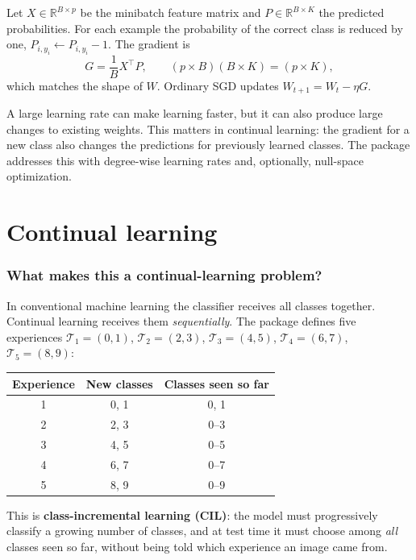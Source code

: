 \documentclass[11pt,a4paper]{article}
\newcommand{\R}{\mathbb{R}}
\begin{document}
Let $X\in\R^{B\times p}$ be the minibatch feature matrix and $P\in\R^{B\times K}$ the predicted probabilities. For each example the probability of the correct class is reduced by one, $P_{i,y_i}\leftarrow P_{i,y_i}-1$. The gradient is
\[
G=\frac1B X^\top P,\qquad (p\times B)(B\times K)=(p\times K),
\]
which matches the shape of $W$. Ordinary SGD updates $W_{t+1}=W_t-\eta G$.

A large learning rate can make learning faster, but it can also produce large changes to existing weights. This matters in continual learning: the gradient for a new class also changes the predictions for previously learned classes. The package addresses this with degree-wise learning rates and, optionally, null-space optimization.

\part{Continual learning}

\section{What makes this a continual-learning problem?}

In conventional machine learning the classifier receives all classes together. Continual learning receives them \emph{sequentially}. The package defines five experiences $\mathcal T_1=(0,1)$, $\mathcal T_2=(2,3)$, $\mathcal T_3=(4,5)$, $\mathcal T_4=(6,7)$, $\mathcal T_5=(8,9)$:

\begin{center}
\begin{tabular}{@{}ccc@{}}
\toprule
Experience & New classes & Classes seen so far\\
\midrule
1 & 0, 1 & 0, 1\\
2 & 2, 3 & 0--3\\
3 & 4, 5 & 0--5\\
4 & 6, 7 & 0--7\\
5 & 8, 9 & 0--9\\
\bottomrule
\end{tabular}
\end{center}

This is \textbf{class-incremental learning (CIL)}: the model must progressively classify a growing number of classes, and at test time it must choose among \emph{all} classes seen so far, without being told which experience an image came from.
\end{document}
